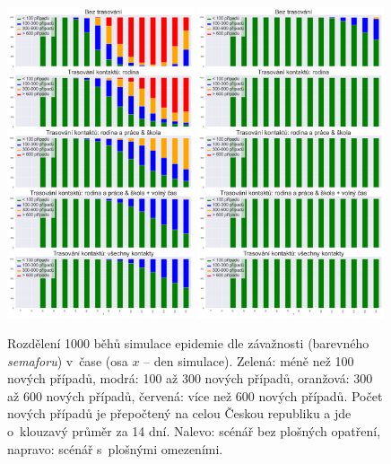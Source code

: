 \begin{figure}
  \centering
  \includegraphics[width=0.49\textwidth]{pic/bar_prubeh_history_second_exp.png}
  \hfill
  \includegraphics[width=0.49\textwidth]{pic/bar_prubeh_history_second_expB.png}
  \caption{Rozdělení 1000 běhů simulace epidemie dle závažnosti (barevného {\em
      semaforu}) v~čase (osa $x$ -- den simulace). Zelená: méně než 100 nových
    případů, modrá: 100 až 300 nových případů, oranžová: 300 až 600 nových
    případů, červená: více než 600 nových případů. Počet nových případů je
    přepočtený na celou Českou republiku a jde o~klouzavý průměr za 14
    dní. Nalevo: scénář bez plošných opatření, napravo: scénář s~plošnými omezeními.}
  \label{pg:fig:exp1ab}
\end{figure}


